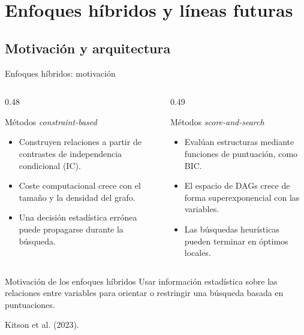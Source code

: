 \documentclass[aspectratio=169,11pt]{beamer}
\begin{document}
\section[Enfoques híbridos]{Enfoques híbridos y líneas futuras}
\subsection{Motivación y arquitectura}

\begin{frame}[t]{Enfoques híbridos: motivación}
  \begin{columns}[T,onlytextwidth]
    \begin{column}{0.48\textwidth}
      \begin{block}{Métodos \textit{constraint-based}}
        \begin{itemize}
          \item Construyen relaciones a partir de contrastes de independencia condicional (IC).
          \item Coste computacional crece con el tamaño y la densidad del grafo.
          \item Una decisión estadística errónea puede propagarse durante la búsqueda.
        \end{itemize}
      \end{block}
    \end{column}
    \begin{column}{0.49\textwidth}
      \begin{block}{Métodos \textit{score-and-search}}
        \begin{itemize}
          \item Evalúan estructuras mediante funciones de puntuación, como BIC.
          \item El espacio de DAGs crece de forma superexponencial con las variables.
          \item Las búsquedas heurísticas pueden terminar en óptimos locales.
        \end{itemize}
      \end{block}
    \end{column}
  \end{columns}
  \vspace{0.16cm}
  \begin{exampleblock}{Motivación de los enfoques híbridos}
    Usar información estadística sobre las relaciones entre variables para \alert{orientar o restringir} una búsqueda basada en puntuaciones.
  \end{exampleblock}
  {\scriptsize\color{upmgray}Kitson et al. (2023).}
\end{frame}
\end{document}
